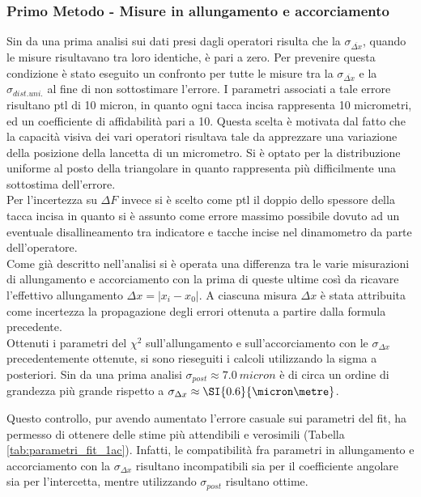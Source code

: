 \documentclass[a4paper,11pt,oneside]{article}
\begin{document}
\subsubsection*{Primo Metodo - Misure in allungamento e accorciamento}
Sin da una prima analisi sui dati presi dagli operatori risulta che la $\sigma_{\overline{\Delta x}}$, quando le misure risultavano tra loro identiche, è pari a zero. Per prevenire questa condizione è stato eseguito un confronto per tutte le misure tra la $\sigma_{\overline{\Delta x}}$ e la $\sigma_{dist. uni.}$ al fine di non sottostimare l'errore. I parametri associati a tale errore risultano ptl di 10 micron, in quanto ogni tacca incisa rappresenta 10 micrometri, ed un coefficiente di affidabilità pari a 10. Questa scelta è motivata dal fatto che la capacità visiva dei vari operatori risultava tale da apprezzare una variazione della posizione della lancetta di un micrometro. Si è optato per la distribuzione uniforme al posto della triangolare in quanto rappresenta più difficilmente una sottostima dell'errore.\\
Per l'incertezza su $\Delta F$ invece si è scelto come ptl il doppio dello spessore della tacca incisa in quanto si è assunto come errore massimo possibile dovuto ad un eventuale disallineamento tra indicatore e tacche incise nel dinamometro da parte dell'operatore.\\

Come già descritto nell'analisi si è operata una differenza tra le varie misurazioni di allungamento e accorciamento con la prima di queste ultime così da ricavare l'effettivo allungamento $\Delta x=| x_{i}-x_{0}|$. A ciascuna misura $\Delta x$ è stata attribuita come incertezza la propagazione degli errori ottenuta a partire dalla formula precedente.\\

Ottenuti i parametri del ${\chi}^2$ sull'allungamento e sull'accorciamento con le $\sigma_{\Delta x}$ precedentemente ottenute, si sono rieseguiti i calcoli utilizzando la sigma a posteriori. Sin da una prima analisi $\sigma_{post} \approx \SI{7.0}{micron}$ è di circa un ordine di grandezza più grande rispetto a $\sigma_{\Delta x} \approx \SI{0.6}{\micron\metre}$.

Questo controllo, pur avendo aumentato l'errore casuale sui parametri del fit, ha permesso di ottenere delle stime più attendibili e verosimili (Tabella \ref{tab:parametri_fit_1ac}). Infatti, le compatibilità fra parametri in allungamento e accorciamento con la $\sigma_{\Delta x}$ risultano incompatibili sia per il coefficiente angolare sia per l'intercetta, mentre utilizzando $\sigma_{post}$ risultano ottime.
\end{document}
